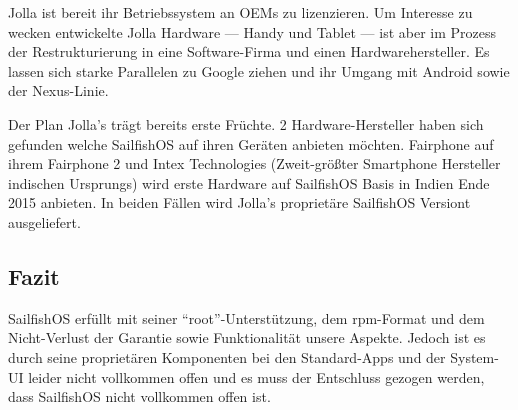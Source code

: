 Jolla ist bereit ihr Betriebssystem an OEMs zu lizenzieren. Um Interesse zu wecken entwickelte Jolla Hardware --- Handy\cite{online:jolla-smartphone} und Tablet\cite{online:jolla-tablet} --- ist aber im Prozess der Restrukturierung in eine Software-Firma und einen Hardwarehersteller\cite{online:jolla-googlelike}. Es lassen sich starke Parallelen zu Google ziehen und ihr Umgang mit Android sowie der Nexus-Linie.

Der Plan Jolla's trägt bereits erste Früchte. 2 Hardware-Hersteller haben sich gefunden welche \mbox{SailfishOS} auf ihren Geräten anbieten möchten. Fairphone auf ihrem Fairphone 2\cite{online:jolla-fairphone2} und Intex Technologies (Zweit-größter Smartphone Hersteller indischen Ursprungs) wird erste Hardware auf \mbox{SailfishOS} Basis in Indien Ende 2015 anbieten\cite{online:jolla-intex-pdf}. In beiden Fällen wird Jolla's proprietäre \mbox{SailfishOS} Versiont ausgeliefert.\\

\subsection{Fazit}
\mbox{SailfishOS} erfüllt mit seiner \mbox{``root''-Unterstützung}, dem rpm-Format und dem Nicht-Verlust der Garantie sowie Funktionalität unsere Aspekte. Jedoch ist es durch seine proprietären Komponenten bei den \mbox{Standard-Apps} und der \mbox{System-UI} leider nicht vollkommen offen und es muss der Entschluss gezogen werden, dass \mbox{SailfishOS} nicht vollkommen offen ist.